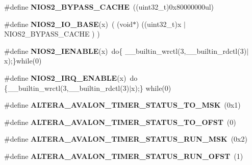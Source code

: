 \begin{DoxyCompactItemize}
\mbox{\label{group__RTEMSBSPsNios2ISS_gae65f8d9e2343ede82369738dfa049f7b}} 
\#define {\bfseries N\+I\+O\+S2\+\_\+\+B\+Y\+P\+A\+S\+S\+\_\+\+C\+A\+C\+HE}~((uint32\+\_\+t)0x80000000ul)
\item 
\mbox{\label{group__RTEMSBSPsNios2ISS_gaffc621a651c41917873653cf6b2ff425}} 
\#define {\bfseries N\+I\+O\+S2\+\_\+\+I\+O\+\_\+\+B\+A\+SE}(x)~( (void$\ast$) ((uint32\+\_\+t)x $\vert$ N\+I\+O\+S2\+\_\+\+B\+Y\+P\+A\+S\+S\+\_\+\+C\+A\+C\+HE ) )
\item 
\mbox{\label{group__RTEMSBSPsNios2ISS_gaba8e1ae6d7f5c53585d6dbb0a9ceab66}} 
\#define {\bfseries N\+I\+O\+S2\+\_\+\+I\+E\+N\+A\+B\+LE}(x)~do\{ \+\_\+\+\_\+builtin\+\_\+wrctl(3,\+\_\+\+\_\+builtin\+\_\+rdctl(3)$\vert$x);\}while(0)
\item 
\mbox{\label{group__RTEMSBSPsNios2ISS_ga2fb357d8a52940f67d7722e8e5b00208}} 
\#define {\bfseries N\+I\+O\+S2\+\_\+\+I\+R\+Q\+\_\+\+E\+N\+A\+B\+LE}(x)~do \{\+\_\+\+\_\+builtin\+\_\+wrctl(3,\+\_\+\+\_\+builtin\+\_\+rdctl(3)$\vert$x);\} while(0)
\item 
\mbox{\label{group__RTEMSBSPsNios2ISS_gaa15f9e34e5c800e30cdcb9d4044b597a}} 
\#define {\bfseries A\+L\+T\+E\+R\+A\+\_\+\+A\+V\+A\+L\+O\+N\+\_\+\+T\+I\+M\+E\+R\+\_\+\+S\+T\+A\+T\+U\+S\+\_\+\+T\+O\+\_\+\+M\+SK}~(0x1)
\item 
\mbox{\label{group__RTEMSBSPsNios2ISS_gaac7b48cd58f4c2c4fd270acfbfa350ee}} 
\#define {\bfseries A\+L\+T\+E\+R\+A\+\_\+\+A\+V\+A\+L\+O\+N\+\_\+\+T\+I\+M\+E\+R\+\_\+\+S\+T\+A\+T\+U\+S\+\_\+\+T\+O\+\_\+\+O\+F\+ST}~(0)
\item 
\mbox{\label{group__RTEMSBSPsNios2ISS_ga3e9c698d589f0fe2304009694ca4f8d9}} 
\#define {\bfseries A\+L\+T\+E\+R\+A\+\_\+\+A\+V\+A\+L\+O\+N\+\_\+\+T\+I\+M\+E\+R\+\_\+\+S\+T\+A\+T\+U\+S\+\_\+\+R\+U\+N\+\_\+\+M\+SK}~(0x2)
\item 
\mbox{\label{group__RTEMSBSPsNios2ISS_gad040e93a3a1a26304fc1cbfbcb9088cb}} 
\#define {\bfseries A\+L\+T\+E\+R\+A\+\_\+\+A\+V\+A\+L\+O\+N\+\_\+\+T\+I\+M\+E\+R\+\_\+\+S\+T\+A\+T\+U\+S\+\_\+\+R\+U\+N\+\_\+\+O\+F\+ST}~(1)

\end{DoxyCompactItemize}
